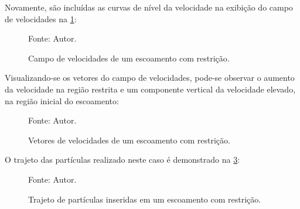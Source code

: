 Novamente, são incluídas as curvas de nível da velocidade na exibição do campo de velocidades na \ref{nozzle_result}:
\begin{figure}[H]
    \centering
     {\raggedleft \scriptsize Fonte: Autor.}
    \caption{Campo de velocidades de um escoamento com restrição.}
    \label{nozzle_result}
\end{figure}

Visualizando-se os vetores do campo de velocidades, pode-se observar o aumento da velocidade na região restrita e um componente vertical da velocidade elevado, na região inicial do escoamento:
\begin{figure}[H]
    \centering
     {\raggedleft \scriptsize Fonte: Autor.}
    \caption{Vetores de velocidades de um escoamento com restrição.}
    \label{nozzle_velocity}
\end{figure}

O trajeto das partículas realizado neste caso é demonstrado na \ref{nozzle_trajectory}:
\begin{figure}[H]
    \centering
     {\raggedleft \scriptsize Fonte: Autor.}
    \caption{Trajeto de partículas inseridas em um escoamento com restrição.}
    \label{nozzle_trajectory}
\end{figure}

